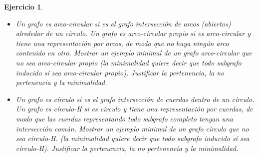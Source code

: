 \documentclass[a4paper,oneside,12pt]{amsart}
\newtheorem{quest}{Ejercicio}
\begin{document}
\begin{quest}{\tiny \hspace{1cm}}

\begin{itemize}
    \item[a)]  Un grafo es arco-circular si es el grafo intersección de arcos (abiertos) alrededor de un círculo. Un grafo es arco-circular propio si es arco-circular y tiene una representación por arcos, de modo que no haya ningún arco contenido en otro. Mostrar un ejemplo minimal de un grafo arco-circular que no sea arco-circular propio (la minimalidad quiere decir que todo subgrafo inducido sí sea arco-circular propio). Justificar la pertenencia, la no pertenencia y la minimalidad.
    
    \item[b)] Un grafo es círculo si es el grafo intersección de cuerdas dentro de un círculo. Un grafo es círculo-H si es círculo y tiene una representación por cuerdas, de modo que las cuerdas representando todo subgrafo completo tengan una intersección común. Mostrar un ejemplo minimal de un grafo círculo que no sea círculo-H. (la minimalidad quiere decir que todo subgrafo inducido sí sea círculo-H). Justificar la pertenencia, la no pertenencia y la minimalidad.
\end{itemize}
\end{quest}
\end{document}
